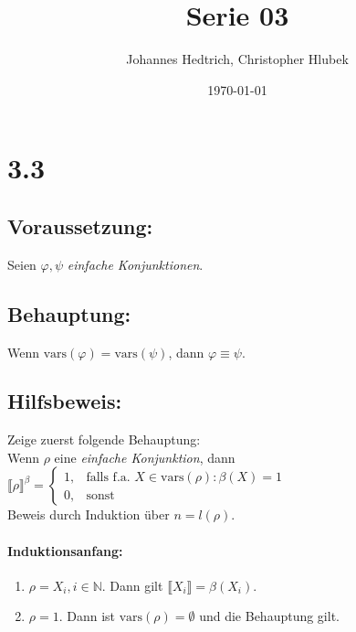 \documentclass[12pt,a4paper]{scrartcl}
\title{Serie 03}
\author{Johannes Hedtrich, Christopher Hlubek}
\date{\today}
\begin{document}
\section*{3.3}

\subsection*{Voraussetzung:}

Seien $\varphi, \psi$ \emph{einfache Konjunktionen}.

\subsection*{Behauptung:}

Wenn $\textrm{vars}(\varphi) = \textrm{vars}(\psi)$, dann $\varphi \equiv \psi$.

\subsection*{Hilfsbeweis:}

Zeige zuerst folgende Behauptung:\\
Wenn $\rho $ eine \emph{einfache Konjunktion}, dann
\begin{math}
\llbracket \rho\rrbracket^\beta = \begin{cases}
1, & \textrm{falls f.a. }X\in \textrm{vars}(\rho): \beta(X) = 1 \\
0, & \textrm{sonst}
\end{cases}
\end{math}\\
Beweis durch Induktion über $n = l(\rho)$.
\paragraph*{Induktionsanfang:}
\begin{enumerate}
\item $\rho = X_i, i \in \mathbb{N}$. Dann gilt $\llbracket X_i\rrbracket = \beta(X_i)$.
\item $\rho = 1$. Dann ist $\textrm{vars}(\rho) = \emptyset$ und die Behauptung gilt.
\end{enumerate}
\end{document}
